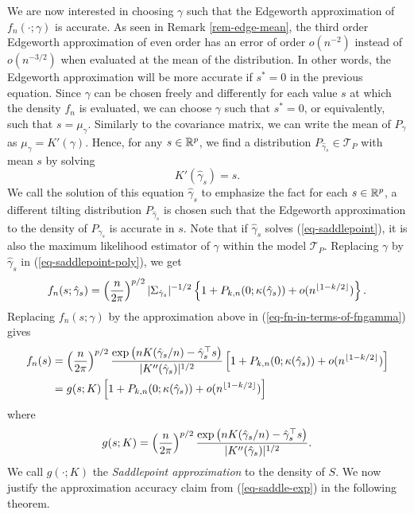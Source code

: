 We are now interested in choosing $\gamma$ such that the Edgeworth approximation of $f_n(\cdot; \gamma)$ is accurate. As seen in Remark \ref{rem-edge-mean}, the third order Edgeworth approximation of even order has an error of order $o(n^{-2})$ instead of $o(n^{-3/2})$ when evaluated at the mean of the distribution. In other words, the Edgeworth approximation will be more accurate if $s^* = 0$ in the previous equation. Since $\gamma$ can be chosen freely and differently for each value $s$ at which the density $f_n$ is evaluated, we can choose $\gamma$ such that $s^* = 0$, or equivalently, such that $s = \mu_\gamma$. Similarly to the covariance matrix, we can write the mean of $P_\gamma$ as $\mu_\gamma = K'(\gamma)$. Hence, for any $s \in {\mathbb{R}^p}$, we find a distribution $P_{\hat\gamma_s} \in \mathcal{T}_P$ with mean $s$ by solving
\begin{equation} \label{eq-saddlepoint}
    K'(\hat\gamma_s) = s.
\end{equation}
We call the solution of this equation $\hat\gamma_s$ to emphasize the fact for each $s \in {\mathbb{R}^p}$, a different tilting distribution $P_{\hat\gamma_s}$ is chosen such that the Edgeworth approximation to the density of $P_{\hat\gamma_s}$ is accurate in $s$. Note that if $\hat\gamma_s$ solves (\ref{eq-saddlepoint}), it is also the maximum likelihood estimator of $\gamma$ within the model $\mathcal{T}_P$. Replacing $\gamma$ by $\hat\gamma_{s}$ in (\ref{eq-saddlepoint-poly}), we get
\begin{equation*}
    f_n(s; \hat\gamma_s) = \left(\frac{n}{2\pi}\right)^{p/2}|\Sigma_{\hat\gamma_s}|^{-1/2}\left\{ 1 + P_{k, n}(0; \kappa(\hat\gamma_s)) + o(n^{\lfloor1-k/2\rfloor})\right\}.
\end{equation*}
Replacing $f_n(s; \gamma)$ by the approximation above in (\ref{eq-fn-in-terms-of-fngamma}) gives
\begin{align}
    f_n(s) &= \left(\frac{n}{2\pi}\right)^{p/2} \frac{\exp\left(nK(\hat\gamma_s / n) - \hat\gamma_s^\top s\right)}{|K''(\hat\gamma_s)|^{1/2}}  \left[1 + P_{k, n}(0; \kappa(\hat\gamma_s)) + o(n^{\lfloor1-k/2\rfloor})\right]\nonumber\\
    &= g(s; K)\left[1 + P_{k, n}(0; \kappa(\hat\gamma_s)) + o(n^{\lfloor1-k/2\rfloor})\right] \label{eq-saddle-exp}
\end{align}
where
\begin{equation*}
    g(s; K) = \left(\frac{n}{2\pi}\right)^{p/2} \frac{\exp\left(nK(\hat\gamma_s / n) - \hat\gamma_s^\top s\right)}{|K''(\hat\gamma_s)|^{1/2}}.
\end{equation*}
We call $g(\cdot; K)$ the \textit{Saddlepoint approximation} to the density of $S$. We now justify the approximation accuracy claim from (\ref{eq-saddle-exp}) in the following theorem.

